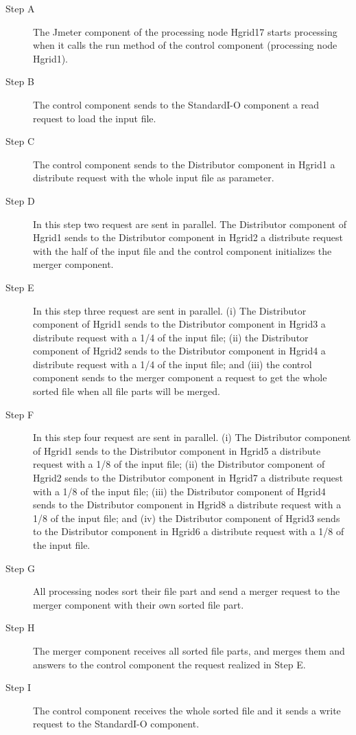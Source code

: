 \begin{description}
	\item [Step A] The Jmeter component of the processing node Hgrid17 starts processing when it calls the run method of the control component (processing node Hgrid1).
	\item [Step B] The control component sends to the StandardI-O component a read request to load the input file.
	\item [Step C] The control component sends to the Distributor component in Hgrid1 a distribute request with the whole input file as parameter.
	\item [Step D] In this step two request are sent in parallel. The Distributor component of Hgrid1 sends to the Distributor component in Hgrid2 a distribute request with the half of the input file and the control component initializes the merger component.
	\item [Step E] In this step three request are sent in parallel. (i) The Distributor component of Hgrid1 sends to the Distributor component in Hgrid3 a distribute request with a 1/4 of the input file; (ii) the Distributor component of Hgrid2 sends to the Distributor component in Hgrid4 a distribute request with a 1/4 of the input file; and (iii) the control component sends to the merger component a request to get the whole sorted file when all file parts will be merged.
	\item [Step F] In this step four request are sent in parallel. (i) The Distributor component of Hgrid1 sends to the Distributor component in Hgrid5 a distribute request with a 1/8 of the input file; (ii) the Distributor component of Hgrid2 sends to the Distributor component in Hgrid7 a distribute request with a 1/8 of the input file; (iii) the Distributor component of Hgrid4 sends to the Distributor component in Hgrid8 a distribute request with a 1/8 of the input file; and (iv) the Distributor component of Hgrid3 sends to the Distributor component in Hgrid6 a distribute request with a 1/8 of the input file.
	\item [Step G] All processing nodes sort their file part and send a merger request to the merger component with their own sorted file part.
	\item [Step H] The merger component receives all sorted file parts, and merges them and answers to the control component the request realized in Step E.
	\item [Step I] The control component receives the whole sorted file and it sends a write request to the StandardI-O component.
\end{description}

